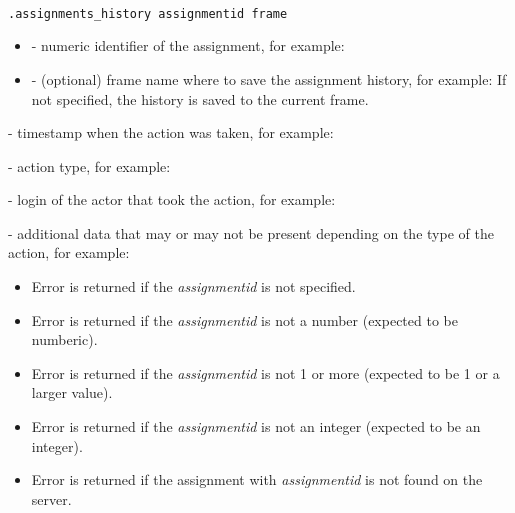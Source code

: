 \begin{lstlisting}[style=CommandLineStyle, showlines=true]

.assignments_history assignmentid frame

\end{lstlisting}

\paramsheader
\begin{itemize}
    \item {} - numeric identifier of the assignment, for
    example:

    \item {} - (optional) frame name where to save the
    assignment history, for example:
    \newline
    If not specified, the history is saved to the current frame.

\end{itemize}


\begin{compactitem}
     - timestamp when the action was taken, for
    example:

     - action type, for example:

     - login of the actor that took the action,
    for example:

     - additional data that may or may not be
    present depending on the type of the action, for example:

\end{compactitem}

\errheader
\begin{itemize}
    \item Error  is returned if the \textit{assignmentid} is not
    specified.
    \item Error  is returned if the \textit{assignmentid} is not a
    number (expected to be numberic).
    \item Error  is returned if the \textit{assignmentid} is not 1
    or more (expected to be 1 or a larger value).
    \item Error  is returned if the \textit{assignmentid} is not an
    integer (expected to be an integer).
    \item Error  is returned if the assignment with
    \textit{assignmentid} is not found on the server.
\end{itemize}


